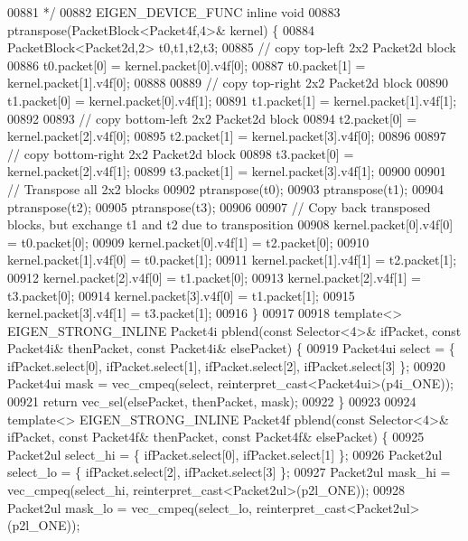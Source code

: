 \begin{DoxyCode}
{00881 \textcolor{comment}{ */}
00882 EIGEN\_DEVICE\_FUNC \textcolor{keyword}{inline} \textcolor{keywordtype}{void}
00883 ptranspose(PacketBlock<Packet4f,4>& kernel) \{
00884   PacketBlock<Packet2d,2> t0,t1,t2,t3;
00885   \textcolor{comment}{// copy top-left 2x2 Packet2d block}
00886   t0.packet[0] = kernel.packet[0].v4f[0];
00887   t0.packet[1] = kernel.packet[1].v4f[0];
00888 
00889   \textcolor{comment}{// copy top-right 2x2 Packet2d block}
00890   t1.packet[0] = kernel.packet[0].v4f[1];
00891   t1.packet[1] = kernel.packet[1].v4f[1];
00892 
00893   \textcolor{comment}{// copy bottom-left 2x2 Packet2d block}
00894   t2.packet[0] = kernel.packet[2].v4f[0];
00895   t2.packet[1] = kernel.packet[3].v4f[0];
00896 
00897   \textcolor{comment}{// copy bottom-right 2x2 Packet2d block}
00898   t3.packet[0] = kernel.packet[2].v4f[1];
00899   t3.packet[1] = kernel.packet[3].v4f[1];
00900 
00901   \textcolor{comment}{// Transpose all 2x2 blocks}
00902   ptranspose(t0);
00903   ptranspose(t1);
00904   ptranspose(t2);
00905   ptranspose(t3);
00906 
00907   \textcolor{comment}{// Copy back transposed blocks, but exchange t1 and t2 due to transposition}
00908   kernel.packet[0].v4f[0] = t0.packet[0];
00909   kernel.packet[0].v4f[1] = t2.packet[0];
00910   kernel.packet[1].v4f[0] = t0.packet[1];
00911   kernel.packet[1].v4f[1] = t2.packet[1];
00912   kernel.packet[2].v4f[0] = t1.packet[0];
00913   kernel.packet[2].v4f[1] = t3.packet[0];
00914   kernel.packet[3].v4f[0] = t1.packet[1];
00915   kernel.packet[3].v4f[1] = t3.packet[1];
00916 \}
00917 
00918 \textcolor{keyword}{template}<> EIGEN\_STRONG\_INLINE Packet4i pblend(\textcolor{keyword}{const} Selector<4>& ifPacket, \textcolor{keyword}{const} Packet4i& thenPacket, \textcolor{keyword}{
      const} Packet4i& elsePacket) \{
00919   Packet4ui select = \{ ifPacket.select[0], ifPacket.select[1], ifPacket.select[2], ifPacket.select[3] \};
00920   Packet4ui mask = vec\_cmpeq(select, reinterpret\_cast<Packet4ui>(p4i\_ONE));
00921   \textcolor{keywordflow}{return} vec\_sel(elsePacket, thenPacket, mask);
00922 \}
00923 
00924 \textcolor{keyword}{template}<> EIGEN\_STRONG\_INLINE Packet4f pblend(\textcolor{keyword}{const} Selector<4>& ifPacket, \textcolor{keyword}{const} Packet4f& thenPacket, \textcolor{keyword}{
      const} Packet4f& elsePacket) \{
00925   Packet2ul select\_hi = \{ ifPacket.select[0], ifPacket.select[1] \};
00926   Packet2ul select\_lo = \{ ifPacket.select[2], ifPacket.select[3] \};
00927   Packet2ul mask\_hi = vec\_cmpeq(select\_hi, reinterpret\_cast<Packet2ul>(p2l\_ONE));
00928   Packet2ul mask\_lo = vec\_cmpeq(select\_lo, reinterpret\_cast<Packet2ul>(p2l\_ONE));
}
\end{DoxyCode}
